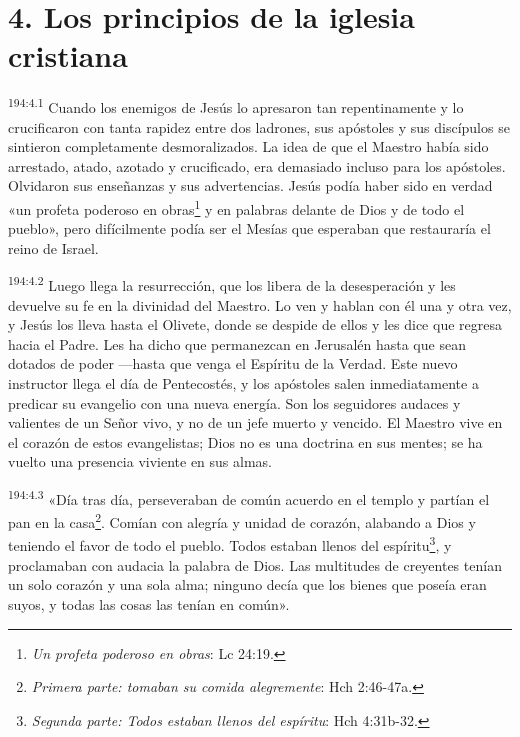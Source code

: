 \section*{4. Los principios de la iglesia cristiana}
\par
\textsuperscript{194:4.1} Cuando los enemigos de Jesús lo apresaron tan repentinamente y lo crucificaron con tanta rapidez entre dos ladrones, sus apóstoles y sus discípulos se sintieron completamente desmoralizados. La idea de que el Maestro había sido arrestado, atado, azotado y crucificado, era demasiado incluso para los apóstoles. Olvidaron sus enseñanzas y sus advertencias. Jesús podía haber sido en verdad «un profeta poderoso en obras\footnote{\textit{Un profeta poderoso en obras}: Lc 24:19.} y en palabras delante de Dios y de todo el pueblo», pero difícilmente podía ser el Mesías que esperaban que restauraría el reino de Israel.

\par
\textsuperscript{194:4.2} Luego llega la resurrección, que los libera de la desesperación y les devuelve su fe en la divinidad del Maestro. Lo ven y hablan con él una y otra vez, y Jesús los lleva hasta el Olivete, donde se despide de ellos y les dice que regresa hacia el Padre. Les ha dicho que permanezcan en Jerusalén hasta que sean dotados de poder ---hasta que venga el Espíritu de la Verdad. Este nuevo instructor llega el día de Pentecostés, y los apóstoles salen inmediatamente a predicar su evangelio con una nueva energía. Son los seguidores audaces y valientes de un Señor vivo, y no de un jefe muerto y vencido. El Maestro vive en el corazón de estos evangelistas; Dios no es una doctrina en sus mentes; se ha vuelto una presencia viviente en sus almas.

\par
\textsuperscript{194:4.3} «Día tras día, perseveraban de común acuerdo en el templo y partían el pan en la casa\footnote{\textit{Primera parte: tomaban su comida alegremente}: Hch 2:46-47a.}. Comían con alegría y unidad de corazón, alabando a Dios y teniendo el favor de todo el pueblo. Todos estaban llenos del espíritu\footnote{\textit{Segunda parte: Todos estaban llenos del espíritu}: Hch 4:31b-32.}, y proclamaban con audacia la palabra de Dios. Las multitudes de creyentes tenían un solo corazón y una sola alma; ninguno decía que los bienes que poseía eran suyos, y todas las cosas las tenían en común».

